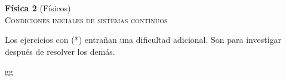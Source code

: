 \documentclass[11pt,spanish,a4paper]{article}
\begin{document}
\begin{center}
\textbf{Física 2} (Físicos) \hfill {}\\
\textsc{\LARGE Condiciones iniciales de sistemas contínuos}
\end{center}


Los ejercicios con (*) entrañan una dificultad adicional. Son para investigar después de resolver los demás.


\begin{enumerate}






gg
\end{enumerate}
\end{document}
